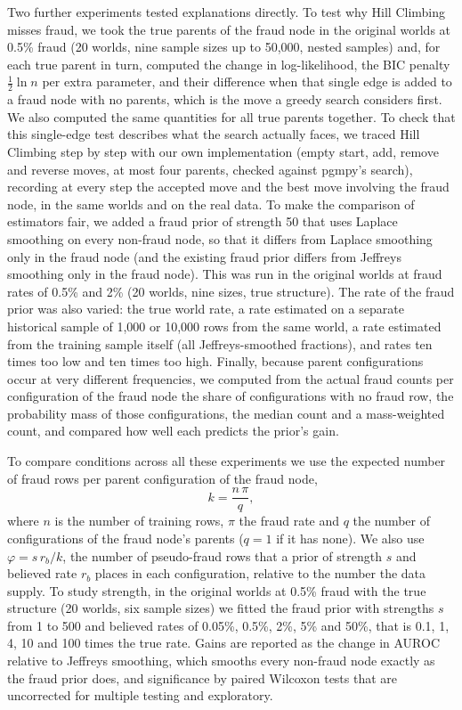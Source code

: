 \documentclass[final,5p,times,authoryear]{elsarticle}
\begin{document}
Two further experiments tested explanations directly. To test why Hill Climbing misses fraud, we took the true parents of the fraud node in the original worlds at 0.5\% fraud (20 worlds, nine sample sizes up to 50,000, nested samples) and, for each true parent in turn, computed the change in log-likelihood, the BIC penalty $\tfrac12\ln n$ per extra parameter, and their difference when that single edge is added to a fraud node with no parents, which is the move a greedy search considers first. We also computed the same quantities for all true parents together. To check that this single-edge test describes what the search actually faces, we traced Hill Climbing step by step with our own implementation (empty start, add, remove and reverse moves, at most four parents, checked against pgmpy's search), recording at every step the accepted move and the best move involving the fraud node, in the same worlds and on the real data. To make the comparison of estimators fair, we added a fraud prior of strength 50 that uses Laplace smoothing on every non-fraud node, so that it differs from Laplace smoothing only in the fraud node (and the existing fraud prior differs from Jeffreys smoothing only in the fraud node). This was run in the original worlds at fraud rates of 0.5\% and 2\% (20 worlds, nine sizes, true structure). The rate of the fraud prior was also varied: the true world rate, a rate estimated on a separate historical sample of 1,000 or 10,000 rows from the same world, a rate estimated from the training sample itself (all Jeffreys-smoothed fractions), and rates ten times too low and ten times too high. Finally, because parent configurations occur at very different frequencies, we computed from the actual fraud counts per configuration of the fraud node the share of configurations with no fraud row, the probability mass of those configurations, the median count and a mass-weighted count, and compared how well each predicts the prior's gain.

To compare conditions across all these experiments we use the expected number of fraud rows per parent configuration of the fraud node,
\begin{equation}
k=\frac{n\,\pi}{q},
\end{equation}
where $n$ is the number of training rows, $\pi$ the fraud rate and $q$ the number of configurations of the fraud node's parents ($q=1$ if it has none). We also use $\varphi=s\,r_b/k$, the number of pseudo-fraud rows that a prior of strength $s$ and believed rate $r_b$ places in each configuration, relative to the number the data supply. To study strength, in the original worlds at 0.5\% fraud with the true structure (20 worlds, six sample sizes) we fitted the fraud prior with strengths $s$ from 1 to 500 and believed rates of 0.05\%, 0.5\%, 2\%, 5\% and 50\%, that is 0.1, 1, 4, 10 and 100 times the true rate. Gains are reported as the change in AUROC relative to Jeffreys smoothing, which smooths every non-fraud node exactly as the fraud prior does, and significance by paired Wilcoxon tests that are uncorrected for multiple testing and exploratory.
\end{document}
